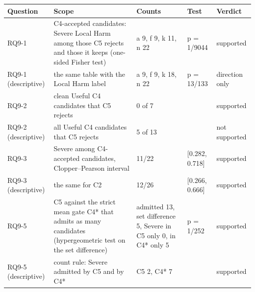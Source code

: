 \begin{tabular}{lllll}
\toprule
Question & Scope & Counts & Test & Verdict \\
\midrule
RQ9-1 & C4-accepted candidates: Severe Local Harm among those C5 rejects and those it keeps (one-sided Fisher test) & a 9, f 9, k 11, n 22 & p = 1/9044 & supported \\
RQ9-1 (descriptive) & the same table with the Local Harm label & a 9, f 9, k 18, n 22 & p = 13/133 & direction only \\
RQ9-2 & clean Useful C4 candidates that C5 rejects & 0 of 7 &  & supported \\
RQ9-2 (descriptive) & all Useful C4 candidates that C5 rejects & 5 of 13 &  & not supported \\
RQ9-3 & Severe among C4-accepted candidates, Clopper–Pearson interval & 11/22 & [0.282, 0.718] & supported \\
RQ9-3 (descriptive) & the same for C2 & 12/26 & [0.266, 0.666] & supported \\
RQ9-5 & C5 against the strict mean gate C4* that admits as many candidates (hypergeometric test on the set difference) & admitted 13, set difference 5, Severe in C5 only 0, in C4* only 5 & p = 1/252 & supported \\
RQ9-5 (descriptive) & count rule: Severe admitted by C5 and by C4* & C5 2, C4* 7 &  & supported \\
\bottomrule
\end{tabular}

